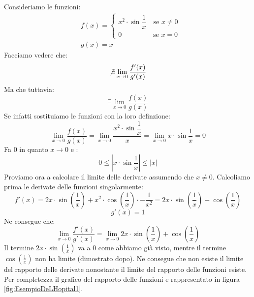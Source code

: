 \begin{itemize}
		Consideriamo le funzioni:
		\begin{align*}
			&f(x) = 
			\begin{cases*}
				x^2 \cdot \sin{\dfrac{1}{x}} \quad \text{se } x \neq 0\\
				0 \qquad \qquad \;\; \text{se } x = 0
			\end{cases*}\\[10pt]
			&g(x) = x
		\end{align*}
		Facciamo vedere che:
		\begin{equation*}
			\not \exists \lim_{x \to 0} \dfrac{f'(x)}{g'(x)}
		\end{equation*}
		Ma che tuttavia:
		\begin{equation*}
			\exists \lim_{x \to 0} \dfrac{f(x)}{g(x)}
		\end{equation*}
		Se infatti sostituiamo le funzioni con la loro definzione:
		\begin{equation*}
			\lim_{x \to 0} \dfrac{f(x)}{g(x)} = \lim_{x \to 0} \dfrac{x^2 \cdot \sin{\dfrac{1}{x}}}{x} = \lim_{x \to 0} x \cdot \sin{\dfrac{1}{x}} = 0
		\end{equation*}
		Fa 0 in quanto $x \to 0$ e :
		\begin{equation*}
			0 \leq \left| x \cdot \sin{\dfrac{1}{x}} \right| \leq |x|
		\end{equation*}
		Proviamo ora a calcolare il limite delle derivate assumendo che $x \neq 0$. Calcoliamo prima le derivate delle funzioni singolarmente:
		\begin{equation*}
			f'(x) = 2x \cdot \sin \left(\dfrac{1}{x} \right) + x^2 \cdot \cos \left(\dfrac{1}{x} \right) \cdot -\dfrac{1}{x^2} = 2x \cdot \sin \left(\dfrac{1}{x} \right) + \cos \left(\dfrac{1}{x} \right) 
		\end{equation*}
		\begin{equation*}
			g'(x) = 1
		\end{equation*}
		Ne consegue che:
		\begin{equation*}
			\lim_{x \to 0} \dfrac{f'(x)}{g'(x)} = \lim_{x \to 0} 2x \cdot \sin \left(\dfrac{1}{x} \right) + \cos \left(\dfrac{1}{x} \right) 
		\end{equation*}
		Il termine $2x \cdot \sin \left(\frac{1}{x} \right)$ va a 0 come abbiamo già visto, mentre il termine $\cos \left(\frac{1}{x} \right)$ non ha limite (dimostrato dopo). Ne consegue che non esiste il limite del rapporto delle derivate nonostante il limite del rapporto delle funzioni esiste. Per completezza il grafico del rapporto delle funzioni e rappresentato in figura \ref{fig:EsempioDeLHopital1}.


\end{itemize}
